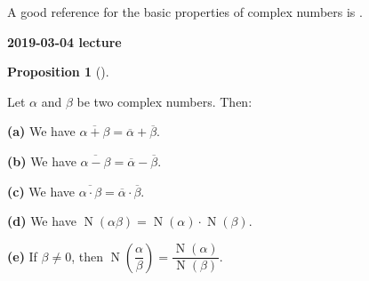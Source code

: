 \documentclass[numbers=enddot,12pt,final,onecolumn,notitlepage]{scrartcl}%
\numberwithin{exer}{subsection}
\theoremstyle{definition}
\newtheorem{prop}[theo]{Proposition}
\newenvironment{proposition}[1][]
{\begin{prop}[#1]\begin{leftbar}}
{\end{leftbar}\end{prop}}
\begin{document}
A good reference for the basic properties of complex numbers is
\cite{LaNaSc16}.

\begin{center}
\textbf{2019-03-04 lecture}
\end{center}

\begin{proposition}
\label{prop.CC.conj.hom}Let $\alpha$ and $\beta$ be two complex numbers. Then:

\textbf{(a)} We have $\overline{\alpha+\beta}=\overline{\alpha}+\overline
{\beta}$.

\textbf{(b)} We have $\overline{\alpha-\beta}=\overline{\alpha}-\overline
{\beta}$.

\textbf{(c)} We have $\overline{\alpha\cdot\beta}=\overline{\alpha}%
\cdot\overline{\beta}$.

\textbf{(d)} We have $\operatorname*{N}\left(  \alpha\beta\right)
=\operatorname*{N}\left(  \alpha\right)  \cdot\operatorname*{N}\left(
\beta\right)  $.

\textbf{(e)} If $\beta\neq0$, then $\operatorname*{N}\left(  \dfrac{\alpha
}{\beta}\right)  =\dfrac{\operatorname*{N}\left(  \alpha\right)
}{\operatorname*{N}\left(  \beta\right)  }$.
\end{proposition}
\end{document}

